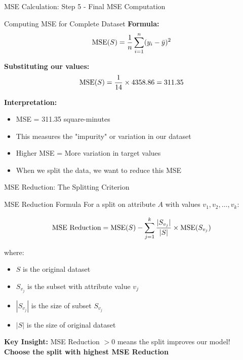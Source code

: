 \documentclass[usenames,dvipsnames]{beamer}
\begin{document}
\begin{frame}{MSE Calculation: Step 5 - Final MSE Computation}
\begin{examplebox}{Computing MSE for Complete Dataset}
\textbf{Formula:} 
\[
\operatorname{MSE}(S) = \frac{1}{n} \sum_{i=1}^{n} (y_i - \bar{y})^2
\]

\pause
\textbf{Substituting our values:}
\[
\operatorname{MSE}(S) = \frac{1}{14} \times 4358.86 = 311.35
\]

\pause
\textbf{Interpretation:}
\begin{itemize}
	\item MSE = 311.35 square-minutes
	\item This measures the "impurity" or variation in our dataset
	\item Higher MSE = More variation in target values
	\item When we split the data, we want to reduce this MSE
\end{itemize}
\end{examplebox}
\end{frame}

\begin{frame}{MSE Reduction: The Splitting Criterion}
\begin{definitionbox}{MSE Reduction Formula}
For a split on attribute $A$ with values $v_1, v_2, \ldots, v_k$:

\vspace{0.3cm}
\[
\text{MSE Reduction} = \operatorname{MSE}(S) - \sum_{j=1}^{k} \frac{|S_{v_j}|}{|S|} \times \operatorname{MSE}(S_{v_j})
\]
\vspace{0.3cm}

where:
\begin{itemize}
	\item $S$ is the original dataset
	\item $S_{v_j}$ is the subset with attribute value $v_j$
	\item $|S_{v_j}|$ is the size of subset $S_{v_j}$
	\item $|S|$ is the size of original dataset
\end{itemize}
\end{definitionbox}

\pause
\begin{keypointsbox}
\textbf{Key Insight:} MSE Reduction $> 0$ means the split improves our model!\\
\textbf{Choose the split with highest MSE Reduction}
\end{keypointsbox}
\end{frame}
\end{document}
